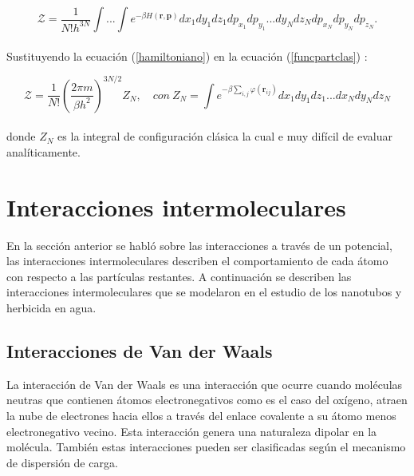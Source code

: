 \begin{equation} \label{funcpartclas}
    \mathcal{Z} = \frac{1}{N!h^{3N}}\int ...\int e^{-\beta H(\mathbf{r},\mathbf{p})}dx_1dy_1dz_1dp_{x_1}dp_{y_1}...dy_N dz_Ndp_{x_N}dp_{y_N}dp_{z_N}.
\end{equation}\\

Sustituyendo la ecuación (\ref{hamiltoniano}) en la ecuación (\ref{funcpartclas}) \cite{feynman1972statistical}:

\begin{equation} \label{funcpartclasconfig}
    \mathcal{Z} = \frac{1}{N!}\left( \frac{2\pi m}{\beta h^2} \right)^{3N/2}Z_N,\quad con\ Z_N = \int e^{-\beta\sum_{i,j}\varphi(\mathbf{r}_{ij})}dx_1dy_1dz_1...dx_N dy_N dz_N
\end{equation}\\

\noindent donde $Z_N$ es la integral de configuración clásica la cual e muy difícil de evaluar analíticamente.


\section{Interacciones intermoleculares}

En la sección anterior se habló sobre las interacciones a través de un potencial, las interacciones intermoleculares describen el comportamiento de cada átomo con respecto a las partículas restantes. A continuación se describen las interacciones intermoleculares que se modelaron en el estudio de los nanotubos y herbicida en agua.\\

\subsection{Interacciones de Van der Waals}

La interacción de Van der Waals es una interacción que ocurre cuando moléculas neutras que contienen átomos electronegativos como es el caso del oxígeno, atraen la nube de electrones hacia ellos a través del enlace covalente a su átomo menos electronegativo vecino. Esta interacción genera una naturaleza dipolar en la molécula. También estas interacciones pueden ser clasificadas según el mecanismo de dispersión de carga.\\

